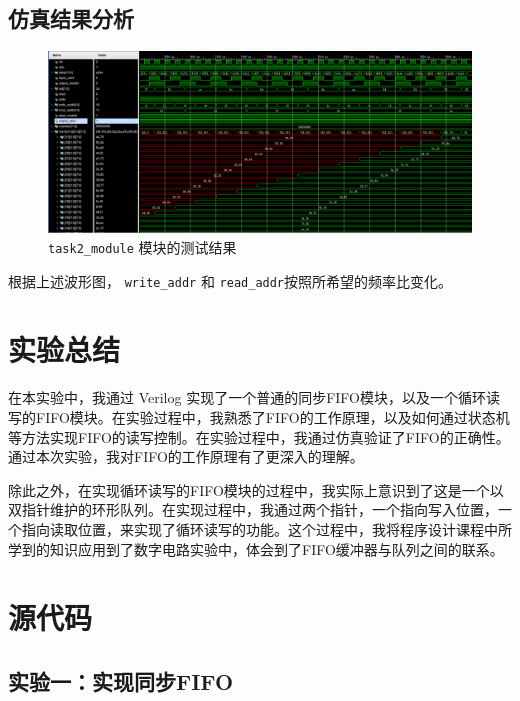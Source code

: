 \documentclass[zihao=5, UTF8]{article}
\theoremstyle{MyLineTheoremStyle} %
\theoremstyle{MyBlockTheoremStyle} %
\theoremstyle{MySubsubsectionStyle} %
\begin{document}
\subsection{仿真结果分析}
\begin{figure}[H]
    \centering
    \includegraphics[width=\textwidth]{simulation_waveform.png} %
    \caption{\texttt{task2\_module} 模块的测试结果}
    \label{fig:task2_module模块的测试结果}
\end{figure}

根据上述波形图， \texttt{write\_addr} 和 \texttt{read\_addr}按照所希望的频率比变化。


\section{实验总结}

在本实验中，我通过 Verilog 实现了一个普通的同步FIFO模块，以及一个循环读写的FIFO模块。在实验过程中，我熟悉了FIFO的工作原理，以及如何通过状态机等方法实现FIFO的读写控制。在实验过程中，我通过仿真验证了FIFO的正确性。通过本次实验，我对FIFO的工作原理有了更深入的理解。

除此之外，在实现循环读写的FIFO模块的过程中，我实际上意识到了这是一个以双指针维护的环形队列。在实现过程中，我通过两个指针，一个指向写入位置，一个指向读取位置，来实现了循环读写的功能。这个过程中，我将程序设计课程中所学到的知识应用到了数字电路实验中，体会到了FIFO缓冲器与队列之间的联系。

\section{源代码}

\subsection{实验一：实现同步FIFO}
\end{document}
